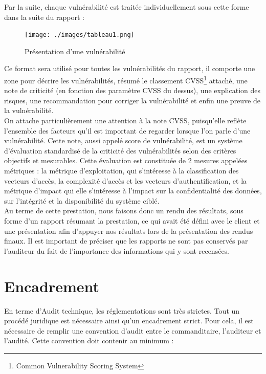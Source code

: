 \documentclass[a4paper]{memoir}
\begin{document}
Par la suite, chaque vulnérabilité est traitée individuellement sous cette forme dans la suite du rapport : 

\begin{figure}[!ht]
\center
\texttt{[image: ./images/tableau1.png]}
\caption{Présentation d'une vulnérabilité}
\label{ID}
\end{figure}

Ce format sera utilisé pour toutes les vulnérabilités du rapport, il comporte une zone pour décrire les vulnérabilités, résumé le classement CVSS\footnote{Common Vulnerability Scoring System} attaché, une note de criticité (en fonction des paramètre CVSS du dessus), une explication des risques, une recommandation pour corriger la vulnérabilité et enfin une preuve de la vulnérabilité.\\

On attache particulièrement une attention à la note CVSS, puisqu'elle reflète l'ensemble des facteurs qu'il est important de regarder lorsque l'on parle d'une vulnérabilité.
Cette note, aussi appelé score de vulnérabilité, est un système d'évaluation standardisé de la criticité des vulnérabilités selon des critères objectifs et mesurables. Cette évaluation est constituée de 2 mesures appelées métriques : la métrique d'exploitation, qui s'intéresse à la classification des vecteurs d'accès, la complexité d'accès et les vecteurs d'authentification, et la métrique d'impact qui elle s'intéresse à l'impact sur la confidentialité des données, sur l'intégrité et la disponibilité  du système ciblé.\\

Au terme de cette prestation, nous faisons donc un rendu des résultats, sous forme d'un rapport résumant la prestation, ce qui avait été défini avec le client et une présentation afin d'appuyer nos résultats lors de la présentation des rendus finaux.
Il est important de préciser que les rapports ne sont pas conservés par l'auditeur du fait de l'importance des informations qui y sont recensées.


\chapter{Encadrement}

En terme d'Audit technique, les réglementations sont très strictes. Tout un procédé juridique est nécessaire ainsi qu’un encadrement strict. Pour cela, il est nécessaire de remplir une convention d'audit entre le commanditaire, l'auditeur et l'audité. Cette convention doit contenir au minimum : \\
\end{document}
